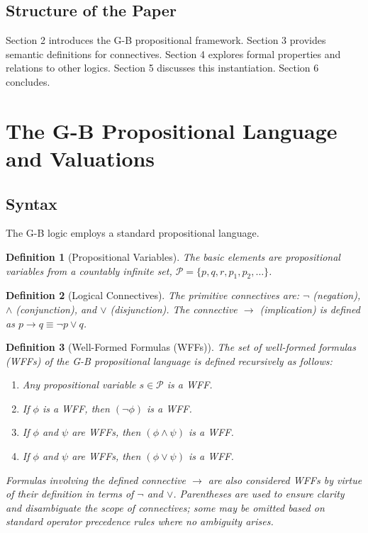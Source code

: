 \documentclass[11pt]{article}
\newtheorem{definition}{Definition}[section]
\theoremstyle{remark}
\begin{document}
\subsection{Structure of the Paper}
Section 2 introduces the G-B propositional framework. Section 3 provides semantic definitions for connectives. Section 4 explores formal properties and relations to other logics. Section 5 discusses this instantiation. Section 6 concludes.

\section{The G-B Propositional Language and Valuations}

\subsection{Syntax}
The G-B logic employs a standard propositional language.
\begin{definition}[Propositional Variables]
The basic elements are propositional variables from a countably infinite set, $\mathcal{P} = \{p, q, r, p_1, p_2, \dots\}$.
\end{definition}

\begin{definition}[Logical Connectives]
The primitive connectives are: $\neg$ (negation), $\land$ (conjunction), and $\lor$ (disjunction). The connective $\rightarrow$ (implication) is defined as $p \rightarrow q \equiv \neg p \lor q$.
\end{definition}

\begin{definition}[Well-Formed Formulas (WFFs)] \label{def:wff}
The set of well-formed formulas (WFFs) of the G-B propositional language is defined recursively as follows: 
\begin{enumerate}
    \item Any propositional variable $s \in \mathcal{P}$ is a WFF.
    \item If $\phi$ is a WFF, then $(\neg \phi)$ is a WFF.
    \item If $\phi$ and $\psi$ are WFFs, then $(\phi \land \psi)$ is a WFF.
    \item If $\phi$ and $\psi$ are WFFs, then $(\phi \lor \psi)$ is a WFF.
\end{enumerate}
Formulas involving the defined connective $\rightarrow$ are also considered WFFs by virtue of their definition in terms of $\neg$ and $\lor$. Parentheses are used to ensure clarity and disambiguate the scope of connectives; some may be omitted based on standard operator precedence rules where no ambiguity arises.
\end{definition}
\end{document}
